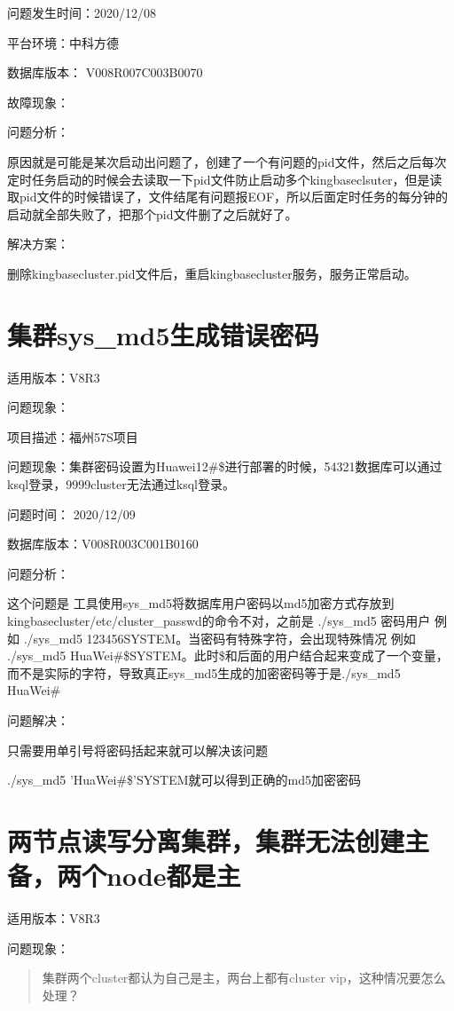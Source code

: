 \documentclass[letterpaper,10pt,english]{sphinxmanual}
\begin{document}
问题发生时间：2020/12/08

平台环境：中科方德

数据库版本： V008R007C003B0070

故障现象：

问题分析：

原因就是可能是某次启动出问题了，创建了一个有问题的pid文件，然后之后每次定时任务启动的时候会去读取一下pid文件防止启动多个kingbaseclsuter，但是读取pid文件的时候错误了，文件结尾有问题报EOF，所以后面定时任务的每分钟的启动就全部失败了，把那个pid文件删了之后就好了。

解决方案：

删除kingbasecluster.pid文件后，重启kingbasecluster服务，服务正常启动。


\section{集群sys\_md5生成错误密码}
\label{\detokenize{cluster_faq:sys-md5}}
适用版本：V8R3

问题现象：

项目描述：福州57S项目

问题现象：集群密码设置为Huawei12\#\$进行部署的时候，54321数据库可以通过ksql登录，9999cluster无法通过ksql登录。

问题时间： 2020/12/09

数据库版本：V008R003C001B0160

问题分析：

这个问题是 工具使用sys\_md5将数据库用户密码以md5加密方式存放到kingbasecluster/etc/cluster\_passwd的命令不对，之前是 ./sys\_md5 密码用户 例如 ./sys\_md5 123456SYSTEM。当密码有特殊字符，会出现特殊情况 例如 ./sys\_md5 HuaWei\#\$SYSTEM。此时\$和后面的用户结合起来变成了一个变量，而不是实际的字符，导致真正sys\_md5生成的加密密码等于是./sys\_md5 HuaWei\#

问题解决：

只需要用单引号将密码括起来就可以解决该问题

./sys\_md5 'HuaWei\#\$'SYSTEM就可以得到正确的md5加密密码


\section{两节点读写分离集群，集群无法创建主备，两个node都是主}
\label{\detokenize{cluster_faq:node}}
适用版本：V8R3

问题现象：
\begin{quote}

集群两个cluster都认为自己是主，两台上都有cluster vip，这种情况要怎么处理？
\end{quote}
\end{document}
